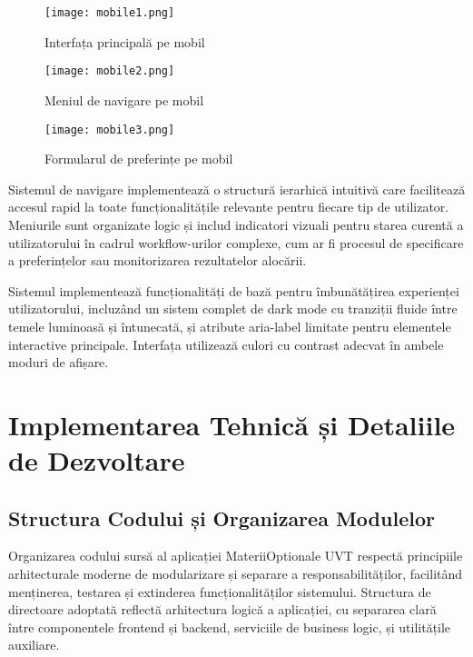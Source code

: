 \documentclass[12pt,a4paper]{report}
\begin{document}
\begin{figure}[H]
\centering
\begin{minipage}{0.3\textwidth}
\centering
\texttt{[image: mobile1.png]}
\caption{Interfața principală pe mobil}
\label{fig:mobile1}
\end{minipage}
\hfill
\begin{minipage}{0.3\textwidth}
\centering
\texttt{[image: mobile2.png]}
\caption{Meniul de navigare pe mobil}
\label{fig:mobile2}
\end{minipage}
\hfill
\begin{minipage}{0.3\textwidth}
\centering
\texttt{[image: mobile3.png]}
\caption{Formularul de preferințe pe mobil}
\label{fig:mobile3}
\end{minipage}
\end{figure}

Sistemul de navigare implementează o structură ierarhică intuitivă care facilitează accesul rapid la toate funcționalitățile relevante pentru fiecare tip de utilizator. Meniurile sunt organizate logic și includ indicatori vizuali pentru starea curentă a utilizatorului în cadrul workflow-urilor complexe, cum ar fi procesul de specificare a preferințelor sau monitorizarea rezultatelor alocării.

Sistemul implementează funcționalități de bază pentru îmbunătățirea experienței utilizatorului, incluzând un sistem complet de dark mode cu tranziții fluide între temele luminoasă și întunecată, și atribute aria-label limitate pentru elementele interactive principale. Interfața utilizează culori cu contrast adecvat în ambele moduri de afișare.

\chapter{Implementarea Tehnică și Detaliile de Dezvoltare}

\section{Structura Codului și Organizarea Modulelor}

Organizarea codului sursă al aplicației MateriiOptionale UVT respectă principiile arhitecturale moderne de modularizare și separare a responsabilităților, facilitând menținerea, testarea și extinderea funcționalităților sistemului. Structura de directoare adoptată reflectă arhitectura logică a aplicației, cu separarea clară între componentele frontend și backend, serviciile de business logic, și utilitățile auxiliare.
\end{document}

